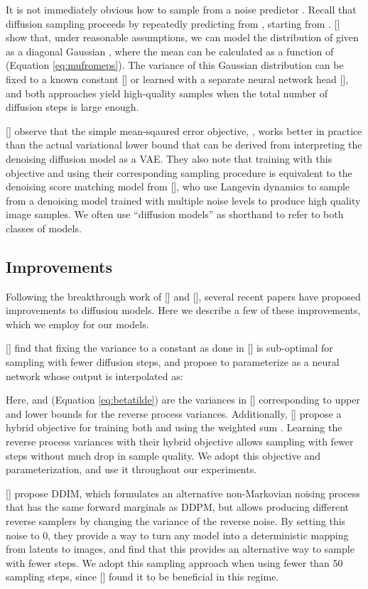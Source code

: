 \documentclass{article}
\newcommand{\shortcite}[1]{[\citenum{#1}]}
\newcommand{\namecite}[1]{\citeauthor{#1} [\citenum{#1}]}
\begin{document}
It is not immediately obvious how to sample from a noise predictor . Recall that diffusion sampling proceeds by repeatedly predicting  from , starting from . \namecite{ddpm} show that, under reasonable assumptions, we can model the distribution  of  given  as a diagonal Gaussian ,
where the mean  can be calculated as a function of  (Equation \ref{eq:mufromeps}). 
The variance  of this Gaussian distribution can be fixed to a known constant \shortcite{ddpm} or learned with a separate neural network head \shortcite{improved}, 
and both approaches yield high-quality samples when the total number of diffusion steps  is large enough.

\namecite{ddpm} observe that the simple mean-sqaured error objective,  , works better in practice than the actual variational lower bound  that can be derived from interpreting the denoising diffusion model as a VAE. They also note that training with this objective and using their corresponding sampling procedure is equivalent to the denoising score matching model from \namecite{improvedscore}, who use Langevin dynamics to sample from a denoising model trained with multiple noise levels to produce high quality image samples. We often use ``diffusion models'' as shorthand to refer to both classes of models.

\subsection{Improvements}
Following the breakthrough work of \namecite{improvedscore} and \namecite{ddpm}, several recent papers have proposed improvements to diffusion models. Here we describe a few of these improvements, which we employ for our models.

\namecite{improved} find that fixing the variance  to a constant as done in \namecite{ddpm} is sub-optimal for sampling with fewer diffusion steps, and propose to parameterize  as a neural network whose output  is interpolated as:


Here,  and  (Equation \ref{eq:betatilde}) are the variances in \namecite{ddpm} corresponding to upper and lower bounds for the reverse process variances. Additionally, \namecite{improved} propose a hybrid objective for training both  and  using the weighted sum . Learning the reverse process variances with their hybrid objective allows sampling with fewer steps without much drop in sample quality. We adopt this objective and parameterization, and use it throughout our experiments.

\namecite{ddim} propose DDIM, which formulates an alternative non-Markovian noising process that has the same forward marginals as DDPM, but allows producing different reverse samplers by changing the variance of the reverse noise. By setting this noise to 0, they provide a way to turn any model  into a deterministic mapping from latents to images, and find that this provides an alternative way to sample with fewer steps. We adopt this sampling approach when using fewer than 50 sampling steps, since \namecite{improved} found it to be beneficial in this regime.
\end{document}
